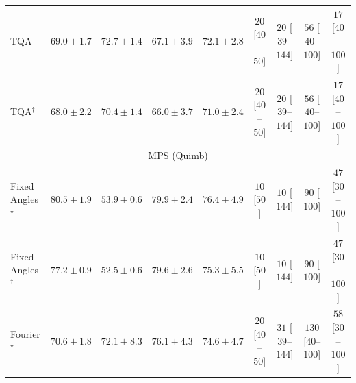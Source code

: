 \begin{tabular}{l|cccc|cccc|}
TQA & {\cellcolor[HTML]{91A1CC}} \color[HTML]{F1F1F1} $69.0\pm 1.7$ & {\cellcolor[HTML]{8C7EBA}} \color[HTML]{F1F1F1} $72.7\pm 1.4$ & {\cellcolor[HTML]{99B2D5}} \color[HTML]{000000} $67.1\pm 3.9$ & {\cellcolor[HTML]{8C85BE}} \color[HTML]{F1F1F1} $72.1\pm 2.8$ & {\cellcolor[HTML]{FFF4F0}} \color[HTML]{000000} $20$ [$40$--$50$] & {\cellcolor[HTML]{FFF4F0}} \color[HTML]{000000} $20$ [$39$--$144$] & {\cellcolor[HTML]{FEECE9}} \color[HTML]{000000} $56$ [$40$--$100$] & {\cellcolor[HTML]{FFF5F1}} \color[HTML]{000000} $17$ [$40$--$100$] \\
TQA$^\dagger$ & {\cellcolor[HTML]{95AAD0}} \color[HTML]{F1F1F1} $68.0\pm 2.2$ & {\cellcolor[HTML]{8C95C6}} \color[HTML]{F1F1F1} $70.4\pm 1.4$ & {\cellcolor[HTML]{9DBAD9}} \color[HTML]{000000} $66.0\pm 3.7$ & {\cellcolor[HTML]{8C8FC2}} \color[HTML]{F1F1F1} $71.0\pm 2.4$ & {\cellcolor[HTML]{FFF4F0}} \color[HTML]{000000} $20$ [$40$--$50$] & {\cellcolor[HTML]{FFF4F0}} \color[HTML]{000000} $20$ [$39$--$144$] & {\cellcolor[HTML]{FEECE9}} \color[HTML]{000000} $56$ [$40$--$100$] & {\cellcolor[HTML]{FFF5F1}} \color[HTML]{000000} $17$ [$40$--$100$] \\
\cline{1-9}
\multicolumn{9}{c}{\rule{0pt}{8pt}MPS (Quimb)} \\
\midrule
Fixed Angles$^\star$ & {\cellcolor[HTML]{BC4503}} \color[HTML]{F1F1F1} $80.5\pm 1.9$ & {\cellcolor[HTML]{FFFCD8}} \color[HTML]{000000} $53.9\pm 0.6$ & {\cellcolor[HTML]{C34802}} \color[HTML]{F1F1F1} $79.9\pm 2.4$ & {\cellcolor[HTML]{E0630D}} \color[HTML]{F1F1F1} $76.4\pm 4.9$ & {\cellcolor[HTML]{FFF7F3}} \color[HTML]{000000} $10$ [$50$] & {\cellcolor[HTML]{FFF7F3}} \color[HTML]{000000} $10$ [$144$] & {\cellcolor[HTML]{FDE5E2}} \color[HTML]{000000} $90$ [$100$] & {\cellcolor[HTML]{FEEEEB}} \color[HTML]{000000} $47$ [$30$--$100$] \\
Fixed Angles$^\dagger$ & {\cellcolor[HTML]{DA5C0A}} \color[HTML]{F1F1F1} $77.2\pm 0.9$ & {\cellcolor[HTML]{FFFFE5}} \color[HTML]{000000} $52.5\pm 0.6$ & {\cellcolor[HTML]{C84A02}} \color[HTML]{F1F1F1} $79.6\pm 2.6$ & {\cellcolor[HTML]{E86C12}} \color[HTML]{F1F1F1} $75.3\pm 5.5$ & {\cellcolor[HTML]{FFF7F3}} \color[HTML]{000000} $10$ [$50$] & {\cellcolor[HTML]{FFF7F3}} \color[HTML]{000000} $10$ [$144$] & {\cellcolor[HTML]{FDE5E2}} \color[HTML]{000000} $90$ [$100$] & {\cellcolor[HTML]{FEEEEB}} \color[HTML]{000000} $47$ [$30$--$100$] \\
Fourier$^\star$ & {\cellcolor[HTML]{FD9627}} \color[HTML]{000000} $70.6\pm 1.8$ & {\cellcolor[HTML]{F78921}} \color[HTML]{F1F1F1} $72.1\pm 8.3$ & {\cellcolor[HTML]{E2650F}} \color[HTML]{F1F1F1} $76.1\pm 4.3$ & {\cellcolor[HTML]{ED7215}} \color[HTML]{F1F1F1} $74.6\pm 4.7$ & {\cellcolor[HTML]{FFF4F0}} \color[HTML]{000000} $20$ [$40$--$50$] & {\cellcolor[HTML]{FFF2EE}} \color[HTML]{000000} $31$ [$39$--$144$] & {\cellcolor[HTML]{FDDBD7}} \color[HTML]{000000} $130$ [$40$--$100$] & {\cellcolor[HTML]{FEECE9}} \color[HTML]{000000} $58$ [$30$--$100$] \\

\end{tabular}
